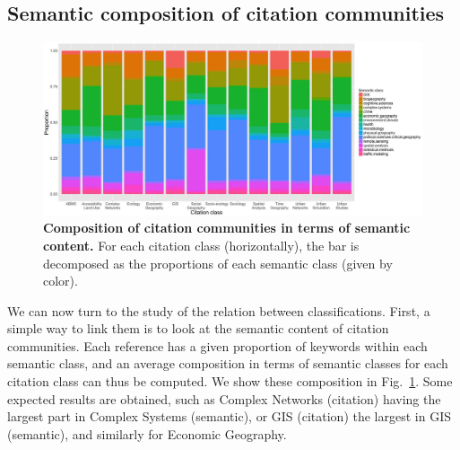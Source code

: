 



\subsection*{Semantic composition of citation communities}


\begin{figure}
\centering
\includegraphics[width=\textwidth]{figures/Fig10.jpg}
\caption{\textbf{Composition of citation communities in terms of semantic content.} For each citation class (horizontally), the bar is decomposed as the proportions of each semantic class (given by color).}
\label{fig:citationcontent}
\end{figure}


We can now turn to the study of the relation between classifications. First, a simple way to link them is to look at the semantic content of citation communities. Each reference has a given proportion of keywords within each semantic class, and an average composition in terms of semantic classes for each citation class can thus be computed. We show these composition in Fig.~\ref{fig:citationcontent}. Some expected results are obtained, such as Complex Networks (citation) having the largest part in Complex Systems (semantic), or GIS (citation) the largest in GIS (semantic), and similarly for Economic Geography.

